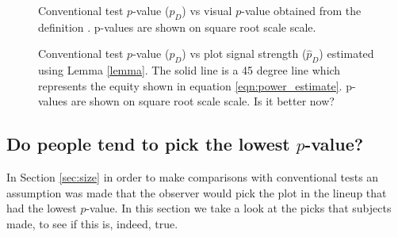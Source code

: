 \documentclass{article}
\newcommand{\blue}[1]{{\color{blue} #1}} %
\newcommand{\hh}[1]{{\color{orange} #1}} %
\begin{document}
\begin{figure}[hbtp]
   \centering
       \caption{Conventional test $p$-value ($p_D$) vs visual $p$-value obtained from the definition . p-values are shown on square root scale scale. }
       \label{fig:pval_definition}
\end{figure}

\begin{figure}[hbtp]
   \centering
       \caption{Conventional test $p$-value ($p_D$) vs plot signal strength ($\hat p_D$) estimated using Lemma \ref{lemma}. The solid line is a 45 degree line which represents the equity shown in equation \ref{eqn:power_estimate}. p-values are shown on square root scale scale. \blue{Is it better now?}}
       \label{fig:pval_plot_signal}
\end{figure}

\subsection{Do people tend to pick the lowest $p$-value?}

In Section \ref{sec:size} in order to make comparisons with conventional tests an assumption was made that the observer would pick the plot in the lineup that had the lowest $p$-value. In this section we take a look at the picks that subjects made, to see if this is, indeed, true. 
\end{document}
